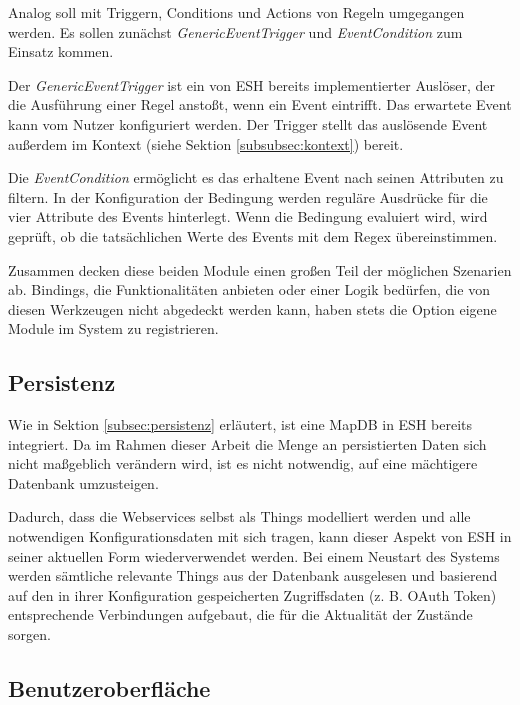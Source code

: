 Analog soll mit Triggern, Conditions und Actions von Regeln umgegangen werden. Es sollen zunächst \textit{GenericEventTrigger} und \textit{EventCondition} zum Einsatz kommen. 

Der \textit{GenericEventTrigger} ist ein von ESH bereits implementierter Auslöser, der die Ausführung einer Regel anstoßt, wenn ein Event eintrifft. Das erwartete Event kann vom Nutzer konfiguriert werden. Der Trigger stellt das auslösende Event außerdem im Kontext (siehe Sektion \ref{subsubsec:kontext}) bereit.

Die \textit{EventCondition} ermöglicht es das erhaltene Event nach seinen Attributen zu filtern. In der Konfiguration der Bedingung werden reguläre Ausdrücke für die vier Attribute des Events hinterlegt. Wenn die Bedingung evaluiert wird, wird geprüft, ob die tatsächlichen Werte des Events mit dem Regex übereinstimmen. 

Zusammen decken diese beiden Module einen großen Teil der möglichen Szenarien ab. Bindings, die Funktionalitäten anbieten oder einer Logik bedürfen, die von diesen Werkzeugen nicht abgedeckt werden kann, haben stets die Option eigene Module im System zu registrieren.




\subsection{Persistenz}
Wie in Sektion \ref{subsec:persistenz} erläutert, ist eine MapDB in ESH bereits integriert. Da im Rahmen dieser Arbeit die Menge an persistierten Daten sich nicht maßgeblich verändern wird, ist es nicht notwendig, auf eine mächtigere Datenbank umzusteigen. 

Dadurch, dass die Webservices selbst als Things modelliert werden und alle notwendigen Konfigurationsdaten mit sich tragen, kann dieser Aspekt von ESH in seiner aktuellen Form wiederverwendet werden. Bei einem Neustart des Systems werden sämtliche relevante Things aus der Datenbank ausgelesen und basierend auf den in ihrer Konfiguration gespeicherten Zugriffsdaten (z. B. OAuth Token) entsprechende Verbindungen aufgebaut, die für die Aktualität der Zustände sorgen.

\subsection{Benutzeroberfläche}
\label{entwurf:gui}
